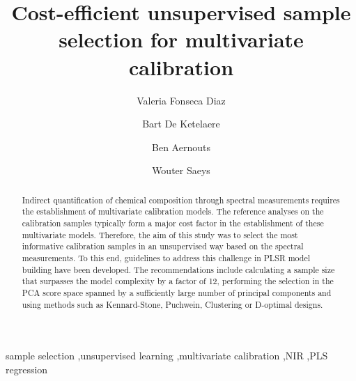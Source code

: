 \documentclass[preprint,12pt]{elsarticle}
\begin{document}
\begin{frontmatter}

\title{Cost-efficient unsupervised sample selection for multivariate calibration}

\author[mebios]{Valeria Fonseca Diaz}

\author[mebios]{Bart De Ketelaere}
\author[mebios,a2h]{Ben Aernouts}
\author[mebios]{Wouter Saeys}


\address[mebios]{KU Leuven, Division of Mechatronics, Biostatistics and Sensors, Kasteelpark Arenberg 30, 3001 Leuven, Belgium}
\address[a2h]{KU Leuven, Animal and Human Health Engineering, Geel Campus, Kleinhoefstraat 4, 2440 Geel, Belgium}

\begin{abstract}
Indirect quantification of chemical composition through spectral measurements requires the establishment of multivariate calibration models. The reference analyses on the calibration samples typically form a major cost factor in the establishment of these multivariate models. Therefore, the aim of this study was to select the most informative calibration samples in an unsupervised way based on the spectral measurements. To this end, guidelines to address this challenge in PLSR model building have been developed. The recommendations include calculating a sample size that surpasses the model complexity by a factor of 12, performing the selection in the PCA score space spanned by a sufficiently large number of principal components and using methods such as Kennard-Stone, Puchwein, Clustering or D-optimal designs.

\end{abstract}%



\begin{keyword}
sample selection \sep unsupervised learning \sep multivariate calibration \sep NIR \sep PLS regression



\end{keyword}

\end{frontmatter}
\end{document}
